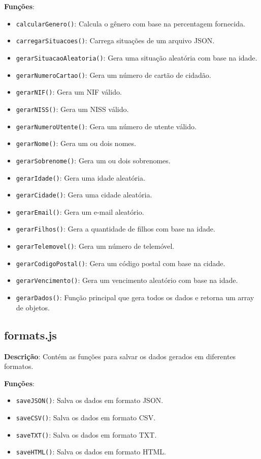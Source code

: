 \documentclass{article}
\begin{document}
\textbf{Funções}:
\begin{itemize}
    \item \texttt{calcularGenero()}: Calcula o gênero com base na percentagem fornecida.
    \item \texttt{carregarSituacoes()}: Carrega situações de um arquivo JSON.
    \item \texttt{gerarSituacaoAleatoria()}: Gera uma situação aleatória com base na idade.
    \item \texttt{gerarNumeroCartao()}: Gera um número de cartão de cidadão.
    \item \texttt{gerarNIF()}: Gera um NIF válido.
    \item \texttt{gerarNISS()}: Gera um NISS válido.
    \item \texttt{gerarNumeroUtente()}: Gera um número de utente válido.
    \item \texttt{gerarNome()}: Gera um ou dois nomes.
    \item \texttt{gerarSobrenome()}: Gera um ou dois sobrenomes.
    \item \texttt{gerarIdade()}: Gera uma idade aleatória.
    \item \texttt{gerarCidade()}: Gera uma cidade aleatória.
    \item \texttt{gerarEmail()}: Gera um e-mail aleatório.
    \item \texttt{gerarFilhos()}: Gera a quantidade de filhos com base na idade.
    \item \texttt{gerarTelemovel()}: Gera um número de telemóvel.
    \item \texttt{gerarCodigoPostal()}: Gera um código postal com base na cidade.
    \item \texttt{gerarVencimento()}: Gera um vencimento aleatório com base na idade.
    \item \texttt{gerarDados()}: Função principal que gera todos os dados e retorna um array de objetos.
\end{itemize}

\subsection{formats.js}
\textbf{Descrição}: Contém as funções para salvar os dados gerados em diferentes formatos.

\textbf{Funções}:
\begin{itemize}
    \item \texttt{saveJSON()}: Salva os dados em formato JSON.
    \item \texttt{saveCSV()}: Salva os dados em formato CSV.
    \item \texttt{saveTXT()}: Salva os dados em formato TXT.
    \item \texttt{saveHTML()}: Salva os dados em formato HTML.
\end{itemize}
\end{document}
